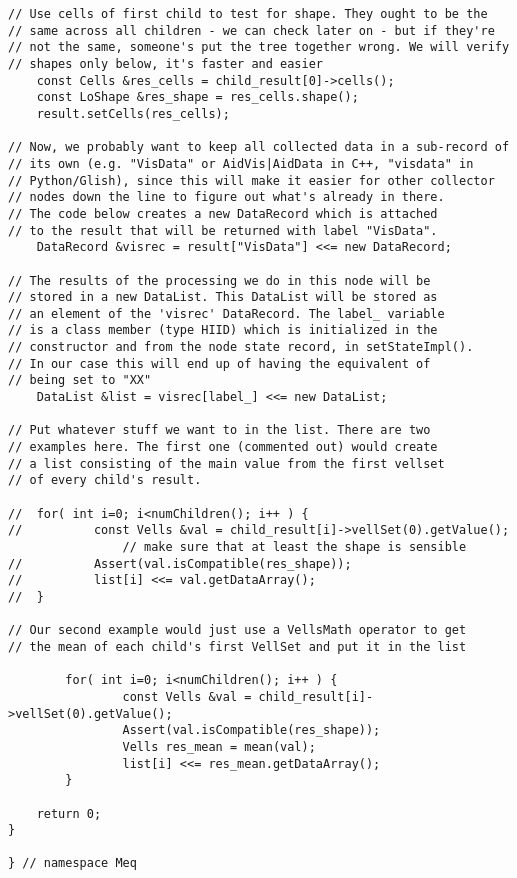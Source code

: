 \documentclass[10pt]{article}
\begin{document}
\begin{verbatim}
// Use cells of first child to test for shape. They ought to be the 
// same across all children - we can check later on - but if they're 
// not the same, someone's put the tree together wrong. We will verify
// shapes only below, it's faster and easier
	const Cells &res_cells = child_result[0]->cells();
	const LoShape &res_shape = res_cells.shape();
	result.setCells(res_cells);

// Now, we probably want to keep all collected data in a sub-record of 
// its own (e.g. "VisData" or AidVis|AidData in C++, "visdata" in 
// Python/Glish), since this will make it easier for other collector 
// nodes down the line to figure out what's already in there.
// The code below creates a new DataRecord which is attached
// to the result that will be returned with label "VisData".
	DataRecord &visrec = result["VisData"] <<= new DataRecord;

// The results of the processing we do in this node will be
// stored in a new DataList. This DataList will be stored as
// an element of the 'visrec' DataRecord. The label_ variable
// is a class member (type HIID) which is initialized in the 
// constructor and from the node state record, in setStateImpl().
// In our case this will end up of having the equivalent of
// being set to "XX" 
	DataList &list = visrec[label_] <<= new DataList;

// Put whatever stuff we want to in the list. There are two
// examples here. The first one (commented out) would create
// a list consisting of the main value from the first vellset 
// of every child's result.

//	for( int i=0; i<numChildren(); i++ ) {
//    		const Vells &val = child_result[i]->vellSet(0).getValue();
                // make sure that at least the shape is sensible
//    		Assert(val.isCompatible(res_shape));
//    		list[i] <<= val.getDataArray();
//	}

// Our second example would just use a VellsMath operator to get
// the mean of each child's first VellSet and put it in the list

        for( int i=0; i<numChildren(); i++ ) {
                const Vells &val = child_result[i]->vellSet(0).getValue();
                Assert(val.isCompatible(res_shape));
                Vells res_mean = mean(val);
                list[i] <<= res_mean.getDataArray();
        }

 	return 0;
}

} // namespace Meq
\end{verbatim}
\end{document}
